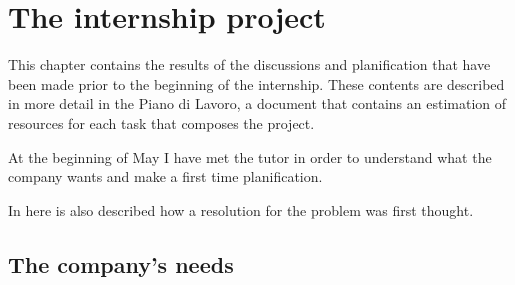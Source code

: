 
\chapter{The internship project}



This chapter contains the results of the discussions and planification that have been made prior to the beginning of the internship.
These contents are described in more detail in the Piano di Lavoro, a document that contains an estimation of resources for each task that composes the project.

At the beginning of May I have met the tutor in order to understand what the company wants and make a first time planification.

In here is also described how a resolution for the problem was first thought.

\section{The company's needs}

